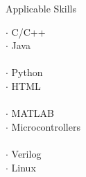 \documentclass{resume} %
\begin{document}
\begin{rSection}{Applicable Skills}
	
	\begin{multicols}{4}
		
		$\cdot$ C/C++\\
		$\cdot$ Java \\
		\\
		$\cdot$ Python \\
		$\cdot$ HTML \\
		\\
		$\cdot$ MATLAB \\
		$\cdot$ Microcontrollers\\
		\\
		$\cdot$ Verilog \\
		$\cdot$ Linux\\

		
		
	\end{multicols}
	
\end{rSection}




\end{document}
